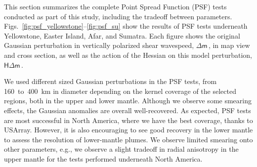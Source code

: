\documentclass[extra,mreferee]{gji}
\begin{document}
This section summarizes the complete Point Spread Function (PSF) tests conducted as part of this study, including the tradeoff between parameters.
Figs.~\ref{fig:psf_yellowstone}--\ref{fig:psf_su} show the results of PSF tests underneath Yellowstone, Easter Island, Afar, and Sumatra.
Each figure shows the original Gaussian perturbation in vertically polarized shear wavespeed, $\mathsf{\Delta}\mathsf{m}$\,, in map view and cross section, as well as the action of the Hessian on this model perturbation, $\mathsf{H}\mathsf{\Delta}\mathsf{m}$\,.

We used different sized Gaussian perturbations in the PSF tests, from 160~to~400~km in diameter depending on the kernel coverage of the selected regions, both in the upper and lower mantle. Although we observe some smearing effects, the Gaussian anomalies are overall well-recovered. As expected, PSF tests are most successful in North America, where we have the best coverage, thanks to USArray. However, it is also encouraging to see good recovery in the lower mantle to assess the resolution of lower-mantle plumes. We observe limited smearing onto other parameters, e.g., we observe a slight tradeoff in radial anisotropy in the upper mantle for the tests performed underneath North America.
\end{document}
